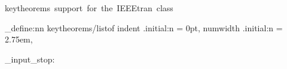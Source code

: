   {keytheorems~support~for~the~IEEEtran~class}

\keys_define:nn { keytheorems/listof }
  {
    indent   .initial:n = 0pt,
    numwidth .initial:n = 2.75em,
  }

\file_input_stop: